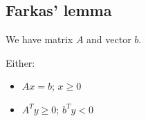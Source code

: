 
\subsection{Farkas' lemma}

We have matrix \(A\) and vector \(b\).

Either:
\begin{itemize}
\item \(Ax=b\); \(x\ge 0\)
\item \(A^Ty\ge 0\); \(b^Ty<0\)
\end{itemize}


